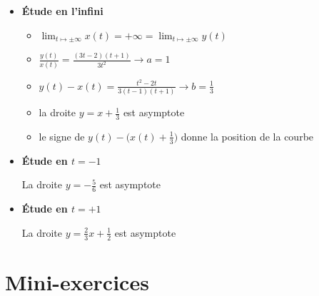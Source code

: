 \begin{frame}
\begin{exemple}
\begin{itemize}
\item \textbf{\'Etude en l'infini}
\pause
	\begin{itemize}
	  \item $\lim_{t\mapsto \pm \infty}x(t)=+\infty=\lim_{t\mapsto \pm \infty}y(t)$
	  \pause
	  \item $\frac{y(t)}{x(t)} =\frac{(3t-2)(t+1)}{3t^2} \to a=1$
	  \pause
	  \item $y(t)-x(t)=\frac{t^2-2t}{3(t-1)(t+1)} \to b=\tfrac{1}{3}$
	  \pause
	  \item la droite $y = x + \tfrac{1}{3}$ est asymptote
	  \pause
	  \item le signe de $y(t)-\big(x(t)+\frac{1}{3}\big)$ donne la position de la courbe 
        \end{itemize}
\pause
\medskip

\item \textbf{\'Etude en $t=-1$} 
\pause

  La droite $y = -\tfrac{5}{6}$ est asymptote
  
  

\pause 
\medskip

\item \textbf{\'Etude en $t=+1$} 
\pause

La droite $y = \tfrac{2}{3}x+\tfrac{1}{2}$ est asymptote

\end{itemize}
\end{exemple}
\end{frame}



\begin{frame}
\vspace*{-1ex}

\end{frame}





\section{Mini-exercices}

